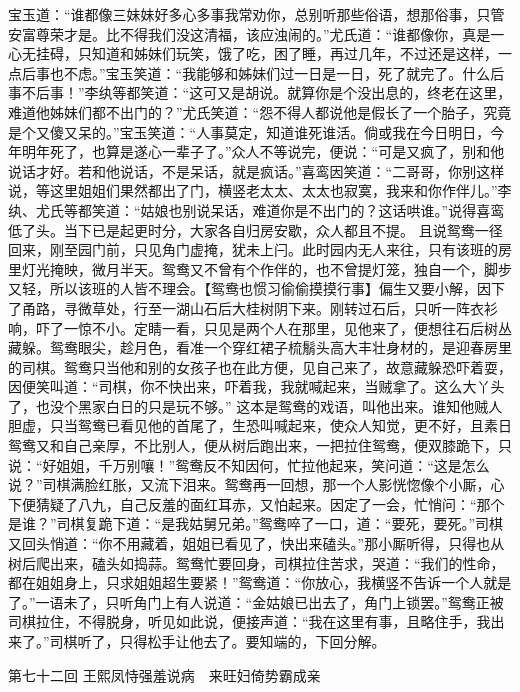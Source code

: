 \documentclass[12pt,oneside]{book}
\begin{document}
宝玉道：“谁都像三妹妹好多心多事我常劝你，总别听那些俗语，想那俗事，只管安富尊荣才是。比不得我们没这清福，该应浊闹的。”尤氏道：“谁都像你，真是一心无挂碍，只知道和姊妹们玩笑，饿了吃，困了睡，再过几年，不过还是这样，一点后事也不虑。”宝玉笑道：“我能够和姊妹们过一日是一日，死了就完了。什么后事不后事！”李纨等都笑道：“这可又是胡说。就算你是个没出息的，终老在这里，难道他姊妹们都不出门的？”尤氏笑道：“怨不得人都说他是假长了一个胎子，究竟是个又傻又呆的。”宝玉笑道：“人事莫定，知道谁死谁活。倘或我在今日明日，今年明年死了，也算是遂心一辈子了。”众人不等说完，便说：“可是又疯了，别和他说话才好。若和他说话，不是呆话，就是疯话。”喜鸾因笑道：“二哥哥，你别这样说，等这里姐姐们果然都出了门，横竖老太太、太太也寂寞，我来和你作伴儿。”李纨、尤氏等都笑道：“姑娘也别说呆话，难道你是不出门的？这话哄谁。”说得喜鸾低了头。当下已是起更时分，大家各自归房安歇，众人都且不提。
且说鸳鸯一径回来，刚至园门前，只见角门虚掩，犹未上闩。此时园内无人来往，只有该班的房里灯光掩映，微月半天。鸳鸯又不曾有个作伴的，也不曾提灯笼，独自一个，脚步又轻，所以该班的人皆不理会。【鸳鸯也惯习偷偷摸摸行事】偏生又要小解，因下了甬路，寻微草处，行至一湖山石后大桂树阴下来。刚转过石后，只听一阵衣衫响，吓了一惊不小。定睛一看，只见是两个人在那里，见他来了，便想往石后树丛藏躲。鸳鸯眼尖，趁月色，看准一个穿红裙子梳鬅头高大丰壮身材的，是迎春房里的司棋。鸳鸯只当他和别的女孩子也在此方便，见自己来了，故意藏躲恐吓着耍，因便笑叫道：“司棋，你不快出来，吓着我，我就喊起来，当贼拿了。这么大丫头了，也没个黑家白日的只是玩不够。”
这本是鸳鸯的戏语，叫他出来。谁知他贼人胆虚，只当鸳鸯已看见他的首尾了，生恐叫喊起来，使众人知觉，更不好，且素日鸳鸯又和自己亲厚，不比别人，便从树后跑出来，一把拉住鸳鸯，便双膝跪下，只说：“好姐姐，千万别嚷！”鸳鸯反不知因何，忙拉他起来，笑问道：“这是怎么说？”司棋满脸红胀，又流下泪来。鸳鸯再一回想，那一个人影恍惚像个小厮，心下便猜疑了八九，自己反羞的面红耳赤，又怕起来。因定了一会，忙悄问：“那个是谁？”司棋复跪下道：“是我姑舅兄弟。”鸳鸯啐了一口，道：“要死，要死。”司棋又回头悄道：“你不用藏着，姐姐已看见了，快出来磕头。”那小厮听得，只得也从树后爬出来，磕头如捣蒜。鸳鸯忙要回身，司棋拉住苦求，哭道：“我们的性命，都在姐姐身上，只求姐姐超生要紧！”鸳鸯道：“你放心，我横竖不告诉一个人就是了。”一语未了，只听角门上有人说道：“金姑娘已出去了，角门上锁罢。”鸳鸯正被司棋拉住，不得脱身，听见如此说，便接声道：“我在这里有事，且略住手，我出来了。”司棋听了，只得松手让他去了。要知端的，下回分解。









 
第七十二回  王熙凤恃强羞说病　来旺妇倚势霸成亲
\end{document}
